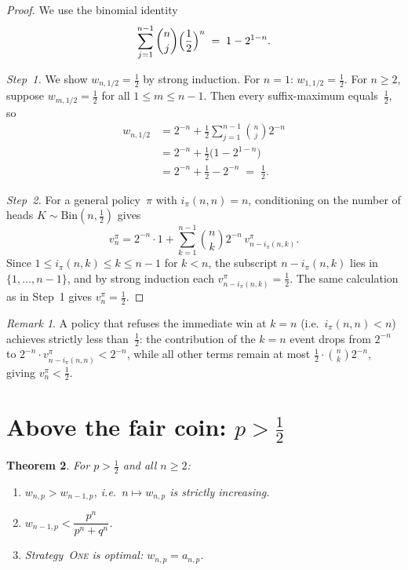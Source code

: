 \documentclass[12pt]{article}
\newtheorem{theorem}{Theorem}[section]
\theoremstyle{definition}
\theoremstyle{remark}
\newtheorem{remark}[theorem]{Remark}
\newcommand{\One}{\textsc{One}}
\begin{document}
\begin{proof}
  We use the binomial identity
  \begin{equation}\label{eq:bin-half}
    \sum_{j=1}^{n-1}\binom{n}{j}\Bigl(\frac{1}{2}\Bigr)^{n}
    \;=\; 1-2^{1-n}.
  \end{equation}

  \emph{Step~1.}  We show $w_{n,1/2}=\tfrac12$ by strong induction.
  For $n=1$: $w_{1,1/2}=\tfrac12$.  For $n\ge 2$, suppose
  $w_{m,1/2}=\tfrac12$ for all $1\le m\le n-1$.  Then every
  suffix-maximum equals~$\tfrac12$, so
  \begin{align*}
    w_{n,1/2}
    &= 2^{-n} + \frac{1}{2}\sum_{j=1}^{n-1}\binom{n}{j}2^{-n} \\
    &= 2^{-n} + \tfrac{1}{2}\bigl(1-2^{1-n}\bigr) \\
    &= 2^{-n} + \tfrac{1}{2} - 2^{-n}
    \;=\; \tfrac{1}{2}.
  \end{align*}

  \emph{Step~2.}  For a general policy~$\pi$ with
  $i_\pi(n,n)=n$, conditioning on the number of heads
  $K\sim\mathrm{Bin}(n,\tfrac12)$ gives
  \[
    v_n^\pi = 2^{-n}\cdot 1 + \sum_{k=1}^{n-1}\binom{n}{k}2^{-n}\,
    v_{n-i_\pi(n,k)}^\pi.
  \]
  Since $1\le i_\pi(n,k)\le k\le n-1$ for $k<n$, the subscript
  $n-i_\pi(n,k)$ lies in $\{1,\dots,n-1\}$, and by strong induction
  each $v_{n-i_\pi(n,k)}^\pi=\tfrac12$.  The same calculation as in
  Step~1 gives $v_n^\pi=\tfrac12$.
\end{proof}

\begin{remark}\label{rem:refuse}
  A policy that refuses the immediate win at $k=n$ (i.e.\
  $i_\pi(n,n)<n$) achieves strictly less than~$\tfrac12$: the
  contribution of the $k=n$ event drops from $2^{-n}$ to
  $2^{-n}\cdot v_{n-i_\pi(n,n)}^\pi < 2^{-n}$, while all other terms
  remain at most $\tfrac12\cdot\binom{n}{k}2^{-n}$, giving
  $v_n^\pi<\tfrac12$.
\end{remark}

\section{Above the fair coin: \texorpdfstring{$p>\tfrac12$}{p > 1/2}}
\label{sec:above}

\begin{theorem}\label{thm:above}
  For $p>\tfrac12$ and all $n\ge 2$:
  \begin{enumerate}[\rm(i)]
  \item $w_{n,p}>w_{n-1,p}$, i.e.\ $n\mapsto w_{n,p}$ is strictly
    increasing.
  \item $w_{n-1,p}<\dfrac{p^n}{p^n+q^n}$.
  \item Strategy~\One{} is optimal: $w_{n,p}=a_{n,p}$.
  \end{enumerate}
\end{theorem}
\end{document}
